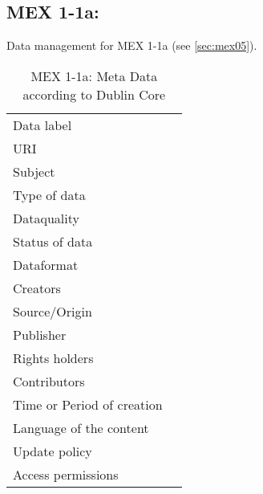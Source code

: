 \subsection{MEX 1-1a:}
Data management for MEX 1-1a (see \ref{sec:mex05}).



\begin{table}[!ht]
\caption{MEX 1-1a: Meta Data according to Dublin Core}
\label{tab:dms-mex1-1a}
\small
\begin{tabular}{R{3cm}|L{7cm}}
\hline
%
Data label &  \\
URI &  \\
Subject  &  \\
Type of data  &  \\
Dataquality  &  \\
Status of data  &  \\
Dataformat  & \\
Creators  &  \\
Source/Origin &  \\
Publisher  &  \\
Rights holders &  \\
Contributors &  \\
Time or Period of creation &  \\
Language of the content &  \\
Update policy &  \\
Access permissions &  \\
%
\hline
\end{tabular}
\end{table}